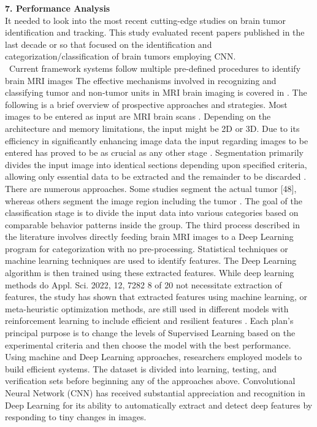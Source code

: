 \documentclass{article}
\begin{document}
       \textbf{ 7. Performance Analysis}\\
It needed to look into the most recent cutting-edge studies on brain tumor identification and tracking.
This study evaluated recent papers published in the last decade or so that focused on the identification
and categorization/classification of brain tumors employing CNN.\\\
Current framework systems follow multiple pre-defined procedures to identify brain MRI images The
effective mechanisms involved in recognizing and classifying tumor and non-tumor units in MRI
brain imaging is covered in . The following is a brief overview of prospective approaches and
strategies. Most images to be entered as input are MRI brain scans . Depending on the architecture
and memory limitations, the input might be 2D or 3D. Due to its efficiency in significantly enhancing
image data the input regarding images to be entered has proved to be as crucial as any other stage .
Segmentation primarily divides the input image into identical sections depending upon specified
criteria, allowing only essential data to be extracted and the remainder to be discarded . There are
numerous approaches. Some studies segment the actual tumor [48], whereas others segment the image
region including the tumor . The goal of the classification stage is to divide the input data into various
categories based on comparable behavior patterns inside the group. The third process described in the
literature involves directly feeding brain MRI images to a Deep Learning program for categorization
with no pre-processing. Statistical techniques or machine learning techniques are used to identify
features. The Deep Learning algorithm is then trained using these extracted features. While deep
learning methods do Appl. Sci. 2022, 12, 7282 8 of 20 not necessitate extraction of features, the study
has shown that extracted features using machine learning, or meta-heuristic optimization methods, are
still used in different models with reinforcement learning to include efficient and resilient features .
Each plan’s principal purpose is to change the levels of Supervised Learning based on the
experimental criteria and then choose the model with the best performance. Using machine and Deep
Learning approaches, researchers employed models to build efficient systems. The dataset is divided
into learning, testing, and verification sets before beginning any of the approaches above.
Convolutional Neural Network (CNN) has received substantial appreciation and recognition in Deep
Learning for its ability to automatically extract and detect deep features by responding to tiny changes
in images. 
\end{document}
